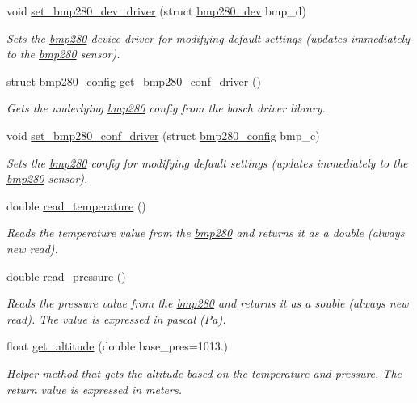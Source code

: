 \begin{DoxyCompactItemize}
void \mbox{\hyperlink{classbmp280_abf2047614752774902d6897bf0de8c02}{set\+\_\+bmp280\+\_\+dev\+\_\+driver}} (struct \mbox{\hyperlink{structbmp280__dev}{bmp280\+\_\+dev}} bmp\+\_\+d)
\begin{DoxyCompactList}\small\item\em Sets the \mbox{\hyperlink{classbmp280}{bmp280}} device driver for modifying default settings (updates immediately to the \mbox{\hyperlink{classbmp280}{bmp280}} sensor). \end{DoxyCompactList}\item 
struct \mbox{\hyperlink{structbmp280__config}{bmp280\+\_\+config}} \mbox{\hyperlink{classbmp280_aa69aa6f655ea7a82e78da96f54aadfb8}{get\+\_\+bmp280\+\_\+conf\+\_\+driver}} ()
\begin{DoxyCompactList}\small\item\em Gets the underlying \mbox{\hyperlink{classbmp280}{bmp280}} config from the bosch driver library. \end{DoxyCompactList}\item 
void \mbox{\hyperlink{classbmp280_ac8426d09704b2d35088d760acb10e876}{set\+\_\+bmp280\+\_\+conf\+\_\+driver}} (struct \mbox{\hyperlink{structbmp280__config}{bmp280\+\_\+config}} bmp\+\_\+c)
\begin{DoxyCompactList}\small\item\em Sets the \mbox{\hyperlink{classbmp280}{bmp280}} config for modifying default settings (updates immediately to the \mbox{\hyperlink{classbmp280}{bmp280}} sensor). \end{DoxyCompactList}\item 
double \mbox{\hyperlink{classbmp280_ae598eb1f714ba9a39896099ee157164f}{read\+\_\+temperature}} ()
\begin{DoxyCompactList}\small\item\em Reads the temperature value from the \mbox{\hyperlink{classbmp280}{bmp280}} and returns it as a double (always new read). \end{DoxyCompactList}\item 
\mbox{\label{classbmp280_a9de10ab597caf99df7c2966452721c4d}} 
double \mbox{\hyperlink{classbmp280_a9de10ab597caf99df7c2966452721c4d}{read\+\_\+pressure}} ()
\begin{DoxyCompactList}\small\item\em Reads the pressure value from the \mbox{\hyperlink{classbmp280}{bmp280}} and returns it as a souble (always new read). The value is expressed in pascal (Pa). \end{DoxyCompactList}\item 
float \mbox{\hyperlink{classbmp280_a0a480dfb132b8efc68f8a9ab00c8d75b}{get\+\_\+altitude}} (double base\+\_\+pres=1013.)
\begin{DoxyCompactList}\small\item\em Helper method that gets the altitude based on the temperature and pressure. The return value is expressed in meters. \end{DoxyCompactList}\end{DoxyCompactItemize}
